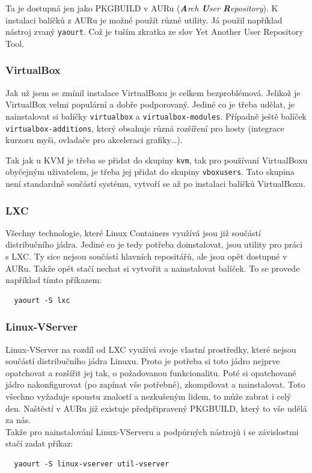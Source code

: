  Ta je dostupná jen jako PKGBUILD v AURu (\textit{\textbf{A}rch \textbf{U}ser \textbf{R}epository}). K instalaci balíčků z AURu je možné použít různé utility. Já použil například nástroj zvaný \texttt{yaourt}. Což je tuším zkratka ze slov Yet Another User Repository Tool.
\subsubsection{VirtualBox}
Jak už jsem se zmínil instalace VirtualBoxu je celkem bezproblémová. Jelikož je VirtualBox velmi populární a dobře podporovaný. Jediné co je třeba udělat, je nainstalovat si balíčky \texttt{virtualbox} a \texttt{virtualbox-modules}. Případně ještě balíček \texttt{virtualbox-additions}, který obsahuje různá rozšíření pro hosty (integrace kurzoru myši, ovladače pro akceleraci grafiky\dots).

Tak jak u KVM je třeba se přidat do skupiny \texttt{kvm}, tak pro používaní VirtualBoxu obyčejným uživatelem, je třeba jej přidat do skupiny \texttt{vboxusers}. Tato skupina není standardně součástí systému, vytvoří se až po instalaci balíčků VirtualBoxu.
\subsubsection{LXC}
Všechny technologie, které Linux Containers využívá jsou již součástí distribučního jádra. Jediné co je tedy potřeba doinstalovat, jsou utility pro práci s LXC. Ty sice nejsou součástí hlavních repositářů, ale jsou opět dostupné v AURu. Takže opět stačí nechat si vytvořit a nainstalovat balíček. To se provede například tímto příkazem:
\begin{verbatim}
  yaourt -S lxc
\end{verbatim}
\subsubsection{Linux-VServer}
Linux-VServer na rozdíl od LXC využívá svoje vlastní prostředky, které nejsou součástí distribučního jádra Linuxu. Proto je potřeba si toto jádro nejprve opatchovat a rozšířit jej tak, o požadovanou funkcionalitu. Poté si opatchované jádro nakonfigurovat (po zapínat vše potřebné), zkompilovat a nainstalovat. Toto všechno vyžaduje spoustu znalostí a nezkušeným lidem, to může zabrat i celý den. Naštěstí v AURu již existuje předpřipravený PKGBUILD, který to vše udělá za nás.
\\
Takže pro nainstalování Linux-VServeru a podpůrných nástrojů i se závislostmi stačí zadat příkaz:
\begin{verbatim}
  yaourt -S linux-vserver util-vserver 
\end{verbatim}

